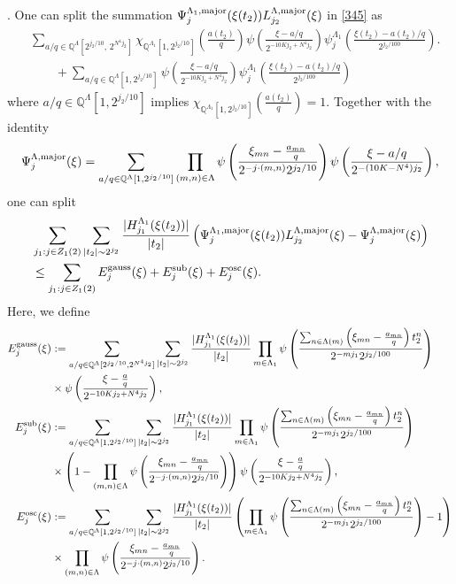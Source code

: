\documentclass[11 pt,letterpaper]{amsart}
\theoremstyle{plain}
\theoremstyle{definition}
\theoremstyle{remark} \theoremstyle{exam} \theoremstyle{ob}
\numberwithin{equation}{section}
\begin{document}
. One can split the summation $\Psi^{\Lambda_1,\rm{major}}_{j}(\xi(t_2))L^{\Lambda,\rm{major}}_{j_2}(\xi)$  in \eqref{345} as
\begin{align*}
&\sum_{ a/q\in  \mathbb{Q}^{\Lambda}[2^{j_2/10},\,2^{N^4 j_2}]}\chi_{\mathbb Q^{\Lambda_1}[1,2^{j_2/10}]}
\!\left(\frac{a(t_2)}{q}\right)
\psi\!\left(
\frac{\xi-a/q}{2^{-10Kj_2+N^4j_2}}
\right)
\psi^{\Lambda_1}_{j}\!\left(
\frac{\xi(t_2)-a(t_2)/q}{2^{j_2/100}}
\right).\\
&\qquad+ \sum_{a/q\in  \mathbb{Q}^{\Lambda}[1,2^{j_2/10}]} 
\psi\!\left(
\frac{\xi-a/q}{2^{-10Kj_2+N^4j_2}}
\right)
\psi^{\Lambda_1}_{j}\!\left(
\frac{\xi(t_2)-a(t_2)/q}{2^{j_2/100}}
\right)
\end{align*}
where    $a/q \in \mathbb{Q}^{\Lambda}[1,2^{j_2/10}]$ implies $ \chi_{\mathbb Q^{\Lambda_1}[1,2^{j_2/10}]}
\!\left(\frac{a(t_2)}{q}\right)=1.$
Together with the identity $$\Psi^{\Lambda,\rm{major}}_{j}(\xi)= \sum_{a/q\in  \mathbb{Q}^{\Lambda}[1, 2^{j_2/10}] } \prod_{(m,n)\in \Lambda}\psi\left(  \frac{  \xi_{mn}-\frac{a_{mn}}{q}}{ 2^{-j\cdot (m,n)}2^{j_2/10}} \right) \psi\left(\frac{\xi-a/q}{2^{-(10K-N^4)j_2}}\right),$$ one can split  
\begin{align*}
	&\sum_{j_1:j\in Z_1(2)}  \sum_{|t_2|\sim 2^{j_2}}    \frac{|H^{\Lambda_1}_{j_1}(\xi(t_2))|}{|t_2|}  \left(\Psi^{\Lambda_1,\rm{major}}_{j}(\xi(t_2))L^{\Lambda,\rm{major}}_{j_2}(\xi)-\Psi^{\Lambda,\rm{major}}_{j}(\xi)\right) \\
	&\le  \sum_{j_1:j\in Z_1(2)} E_j^{\rm{gauss}}(\xi)+E_j^{\rm{sub}}(\xi) +E_j^{\rm{osc}}(\xi). 
\end{align*}
Here, we define
\begin{align}
	E^{\rm{gauss}}_j(\xi)&:= \sum_{ a/q\in \mathbb{Q}^{\Lambda}[2^{j_2/10},2^{N^4 j_2}]}  \sum_{|t_2|\sim 2^{j_2}}    \frac{|H^{\Lambda_1}_{j_1}(\xi(t_2))|}{|t_2|}    \prod_{m\in\Lambda_1}\psi\left( \frac{\sum_{n\in\Lambda(m)}\left( \xi_{mn}-\frac{a_{mn}}{q} \right)t_2^n }{2^{-mj_1} 2^{ j_2/100}} \right) \nonumber \\
	&\times \psi\left(\frac{\xi-\frac{a}{q}}{2^{-10Kj_2+N^4j_2}}\right), \nonumber\\
	E^{\rm{sub}}_j(\xi)&:=  \sum_{ a/q\in \mathbb{Q}^{\Lambda}[1,2^{j_2/10}]}  \sum_{|t_2|\sim 2^{j_2}}   \frac{|H^{\Lambda_1}_{j_1}(\xi(t_2))|}{|t_2|}   \prod_{m\in\Lambda_1}\psi\left( \frac{\sum_{n\in\Lambda(m)}\left( \xi_{mn}-\frac{a_{mn}}{q} \right)t_2^n }{2^{-mj_1} 2^{ j_2/100}} \right)\nonumber \\
	&\times \left(1-\prod_{(m,n)\in\Lambda}\psi\left(  \frac{  \xi_{mn}-\frac{a_{mn}}{q}}{ 2^{-j\cdot (m,n)}2^{j_2/10}} \right)\right)   \psi\left(\frac{\xi-\frac{a}{q}}{2^{-10Kj_2+N^4j_2}}\right),    \notag\\
	E^{\rm{osc}}_j(\xi)&:=   \sum_{ a/q\in \mathbb{Q}^{\Lambda}[1,2^{j_2/10}]}  \sum_{|t_2|\sim 2^{j_2}}   \frac{|H^{\Lambda_1}_{j_1}(\xi(t_2))|}{|t_2|}  \left(  \prod_{m\in\Lambda_1}\psi\left( \frac{\sum_{n\in\Lambda(m)}\left( \xi_{mn}-\frac{a_{mn}}{q} \right)t_2^n }{2^{-mj_1} 2^{ j_2/100}} \right) -1\right)\notag\\
	&\times  \prod_{(m,n)\in\Lambda}\psi\left(  \frac{  \xi_{mn}-\frac{a_{mn}}{q}}{ 2^{-j\cdot (m,n)}2^{j_2/10}} \right).\nonumber
\end{align}
\end{document}
